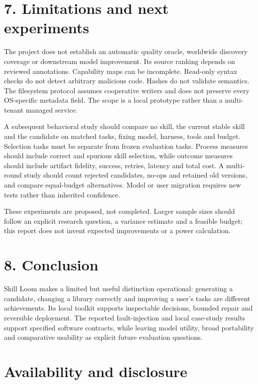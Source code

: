 \documentclass[
  11pt,
]{article}
\begin{document}
\section{7. Limitations and next
experiments}\label{limitations-and-next-experiments}

The project does not establish an automatic quality oracle, worldwide
discovery coverage or downstream model improvement. Its source ranking
depends on reviewed annotations. Capability maps can be incomplete.
Read-only syntax checks do not detect arbitrary malicious code. Hashes
do not validate semantics. The filesystem protocol assumes cooperative
writers and does not preserve every OS-specific metadata field. The
scope is a local prototype rather than a multi-tenant managed service.

A subsequent behavioral study should compare no skill, the current
stable skill and the candidate on matched tasks, fixing model, harness,
tools and budget. Selection tasks must be separate from frozen
evaluation tasks. Process measures should include correct and spurious
skill selection, while outcome measures should include artifact
fidelity, success, retries, latency and total cost. A multi-round study
should count rejected candidates, no-ops and retained old versions, and
compare equal-budget alternatives. Model or user migration requires new
tests rather than inherited confidence.

These experiments are proposed, not completed. Larger sample sizes
should follow an explicit research question, a variance estimate and a
feasible budget; this report does not invent expected improvements or a
power calculation.

\section{8. Conclusion}\label{conclusion}

Skill Loom makes a limited but useful distinction operational:
generating a candidate, changing a library correctly and improving a
user's tasks are different achievements. Its local toolkit supports
inspectable decisions, bounded repair and reversible deployment. The
reported fault-injection and local case-study results support specified
software contracts, while leaving model utility, broad portability and
comparative usability as explicit future evaluation questions.

\section{Availability and disclosure}\label{availability-and-disclosure}
\end{document}
